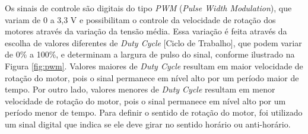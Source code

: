 Os sinais de controle são digitais do tipo \textit{PWM} (\textit{Pulse Width Modulation}), que variam de 0 a 3,3 V e possibilitam o controle da velocidade de rotação dos motores através da variação da tensão média.
Essa variação é feita através da escolha de valores diferentes de \textit{Duty Cycle} [Ciclo de Trabalho], que podem variar de 0\% a 100\%, e determinam a largura de pulso do sinal, conforme ilustrado na Figura \ref{fig:pwm}.
Valores maiores de \textit{Duty Cycle} resultam em maior velocidade de rotação do motor, pois o sinal permanece em nível alto por um período maior de tempo.
Por outro lado, valores menores de \textit{Duty Cycle} resultam em menor velocidade de rotação do motor, pois o sinal permanece em nível alto por um período menor de tempo.
Para definir o sentido de rotação do motor, foi utilizado um sinal digital que indica se ele deve girar no sentido horário ou anti-horário.


